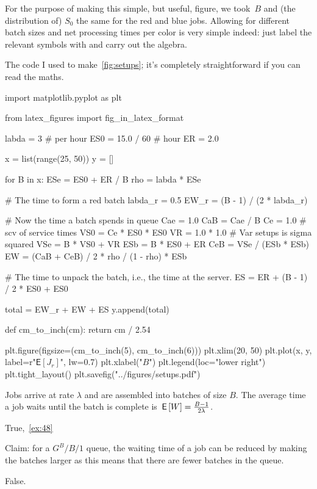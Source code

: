 \documentclass[stochastic-or.tex]{subfiles}
\begin{document}
For the purpose of making this simple, but useful, figure, we took~$B$ and (the distribution of) $S_{0}$ the same for the red and blue jobs.
Allowing for different batch sizes and net processing times per color is very simple indeed: just label the relevant symbols with and carry out the algebra.

The code I used to make~\cref{fig:setups}; it's completely straightforward if you can read the maths.
\begin{python}
import matplotlib.pyplot as plt

from latex_figures import fig_in_latex_format


labda = 3  # per hour
ES0 = 15.0 / 60  # hour
ER = 2.0

x = list(range(25, 50))
y = []

for B in x:
    ESe = ES0 + ER / B
    rho = labda * ESe

    # The time to form a red batch
    labda_r = 0.5
    EW_r = (B - 1) / (2 * labda_r)

    # Now the time a batch spends in queue
    Cae = 1.0
    CaB = Cae / B
    Ce = 1.0  # scv of service times
    VS0 = Ce * ES0 * ES0
    VR = 1.0 * 1.0  # Var setups is sigma squared
    VSe = B * VS0 + VR
    ESb = B * ES0 + ER
    CeB = VSe / (ESb * ESb)
    EW = (CaB + CeB) / 2 * rho / (1 - rho) * ESb

    # The time to unpack the batch, i.e., the time at the server.
    ES = ER + (B - 1) / 2 * ES0 + ES0

    total = EW_r + EW + ES
    y.append(total)


def cm_to_inch(cm):
    return cm / 2.54


plt.figure(figsize=(cm_to_inch(5), cm_to_inch(6)))
plt.xlim(20, 50)
plt.plot(x, y, label=r"$\mathsf{E}[J_r]$", lw=0.7)
plt.xlabel("$B$")
plt.legend(loc="lower right")
plt.tight_layout()
plt.savefig("../figures/setups.pdf")
\end{python}


\begin{truefalse}
 Jobs arrive at rate $\lambda$ and are assembled into batches of size $B$.
 The average time a job waits until the batch is complete is $\,\mathsf{E}\left[W\right] = \frac{B-1}{2\lambda}$.
\begin{solution}True,~\cref{ex:48}
\end{solution}
\end{truefalse}

\begin{truefalse}
    Claim: for a $G^{B}/B/1$ queue, the waiting time of a job can be reduced by making the batches larger as this means that there are fewer batches in the queue.
    \begin{solution}
        False.
\end{solution}
\end{truefalse}
\end{document}
